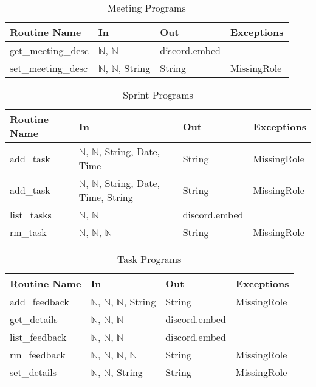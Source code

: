 \documentclass[12pt, titlepage]{article}
\begin{document}
\begin{table}[!htb]
    \centering
    \begin{tabular}{|p{3cm}|p{3cm}|p{3cm}|p{4.5cm}|}
        \hline
        \textbf{Routine Name} & \textbf{In} & \textbf{Out} & \textbf{Exceptions} \\
        \hline
        get\_meeting\_desc & $\mathbb{N}$, $\mathbb{N}$ & discord.embed & \\
        \hline
        set\_meeting\_desc & $\mathbb{N}$, $\mathbb{N}$, String & String & MissingRole \\
        \hline
    \end{tabular}
    \caption{Meeting Programs}
    \label{tab:meetings}
\end{table}

\begin{table}[!htb]
    \centering
    \begin{tabular}{|p{3cm}|p{5.5cm}|p{2.5cm}|p{2.5cm}|}
        \hline
        \textbf{Routine Name} & \textbf{In} & \textbf{Out} & \textbf{Exceptions} \\
        \hline
        add\_task & $\mathbb{N}$, $\mathbb{N}$, String, Date, Time & String & MissingRole\\
        \hline
        add\_task & $\mathbb{N}$, $\mathbb{N}$, String, Date, Time, String & String & MissingRole \\
        \hline
        list\_tasks & $\mathbb{N}$, $\mathbb{N}$ & discord.embed & \\
        \hline
        rm\_task & $\mathbb{N}$, $\mathbb{N}$, $\mathbb{N}$ & String & MissingRole \\
        \hline
    \end{tabular}
    \caption{Sprint Programs}
    \label{tab:sprint}
\end{table}

\begin{table}[H]
    \centering
    \begin{tabular}{|p{3cm}|p{3cm}|p{3cm}|p{4.5cm}|}
        \hline
        \textbf{Routine Name} & \textbf{In} & \textbf{Out} & \textbf{Exceptions} \\
        \hline
        add\_feedback & $\mathbb{N}$, $\mathbb{N}$, $\mathbb{N}$, String & String & MissingRole \\
        \hline
        get\_details & $\mathbb{N}$, $\mathbb{N}$, $\mathbb{N}$ & discord.embed & \\
        \hline
        list\_feedback & $\mathbb{N}$, $\mathbb{N}$, $\mathbb{N}$ & discord.embed & \\
        \hline
        rm\_feedback & $\mathbb{N}$, $\mathbb{N}$, $\mathbb{N}$, $\mathbb{N}$ & String & MissingRole \\
        \hline
        set\_details & $\mathbb{N}$, $\mathbb{N}$, String & String & MissingRole \\
        \hline
    \end{tabular}
    \caption{Task Programs}
    \label{tab:task}
\end{table}
\end{document}
